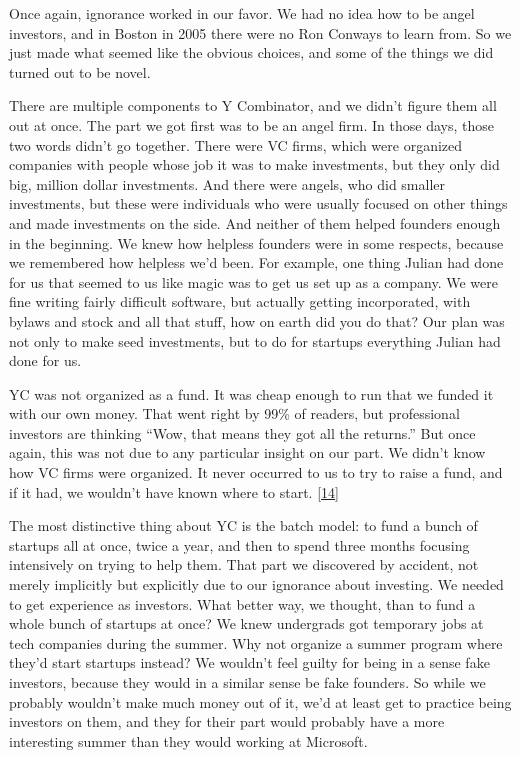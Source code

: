 Once again, ignorance worked in our favor. We had no idea how to be
angel investors, and in Boston in 2005 there were no Ron Conways to
learn from. So we just made what seemed like the obvious choices, and
some of the things we did turned out to be novel.

There are multiple components to Y Combinator, and we didn't figure them
all out at once. The part we got first was to be an angel firm. In those
days, those two words didn't go together. There were VC firms, which
were organized companies with people whose job it was to make
investments, but they only did big, million dollar investments. And
there were angels, who did smaller investments, but these were
individuals who were usually focused on other things and made
investments on the side. And neither of them helped founders enough in
the beginning. We knew how helpless founders were in some respects,
because we remembered how helpless we'd been. For example, one thing
Julian had done for us that seemed to us like magic was to get us set up
as a company. We were fine writing fairly difficult software, but
actually getting incorporated, with bylaws and stock and all that stuff,
how on earth did you do that? Our plan was not only to make seed
investments, but to do for startups everything Julian had done for us.

YC was not organized as a fund. It was cheap enough to run that we
funded it with our own money. That went right by 99\% of readers, but
professional investors are thinking ``Wow, that means they got all the
returns.'' But once again, this was not due to any particular insight on
our part. We didn't know how VC firms were organized. It never occurred
to us to try to raise a fund, and if it had, we wouldn't have known
where to start. {[}\hyperref[f14n]{14}{]}

The most distinctive thing about YC is the batch model: to fund a bunch
of startups all at once, twice a year, and then to spend three months
focusing intensively on trying to help them. That part we discovered by
accident, not merely implicitly but explicitly due to our ignorance
about investing. We needed to get experience as investors. What better
way, we thought, than to fund a whole bunch of startups at once? We knew
undergrads got temporary jobs at tech companies during the summer. Why
not organize a summer program where they'd start startups instead? We
wouldn't feel guilty for being in a sense fake investors, because they
would in a similar sense be fake founders. So while we probably wouldn't
make much money out of it, we'd at least get to practice being investors
on them, and they for their part would probably have a more interesting
summer than they would working at Microsoft.

